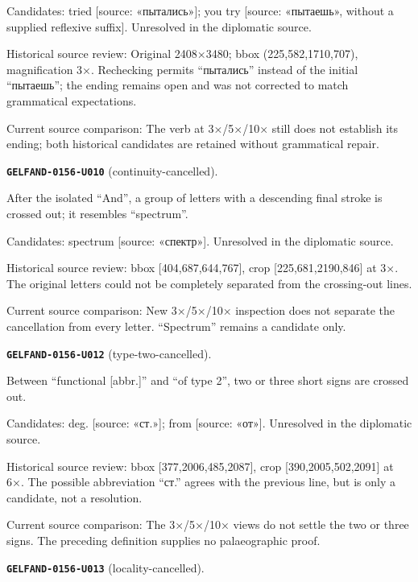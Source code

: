 Candidates: tried [source: «пытались»]; you try [source: «пытаешь», without a supplied reflexive suffix]. Unresolved in the diplomatic source.\par
Historical source review: Original 2408×3480; bbox (225,582,1710,707), magnification 3×. Rechecking permits “пытались” instead of the initial “пытаешь”; the ending remains open and was not corrected to match grammatical expectations.\par
Current source comparison: The verb at 3×/5×/10× still does not establish its ending; both historical candidates are retained without grammatical repair.\par\medskip
\par\noindent\leavevmode{}\label{GELFAND-0156-U010}\label{GELFAND-P001439:continuity-cancelled}\textbf{\texttt{GELFAND-0156-U010}} (continuity-cancelled).\nopagebreak[4]\par
After the isolated “And”, a group of letters with a descending final stroke is crossed out; it resembles “spectrum”.\par
Candidates: spectrum [source: «спектр»]. Unresolved in the diplomatic source.\par
Historical source review: bbox [404,687,644,767], crop [225,681,2190,846] at 3×. The original letters could not be completely separated from the crossing-out lines.\par
Current source comparison: New 3×/5×/10× inspection does not separate the cancellation from every letter. “Spectrum” remains a candidate only.\par\medskip
\par\noindent\leavevmode{}\label{GELFAND-0156-U012}\label{GELFAND-P001439:type-two-cancelled}\textbf{\texttt{GELFAND-0156-U012}} (type-two-cancelled).\nopagebreak[4]\par
Between “functional [abbr.]” and “of type 2”, two or three short signs are crossed out.\par
Candidates: deg. [source: «ст.»]; from [source: «от»]. Unresolved in the diplomatic source.\par
Historical source review: bbox [377,2006,485,2087], crop [390,2005,502,2091] at 6×. The possible abbreviation “ст.” agrees with the previous line, but is only a candidate, not a resolution.\par
Current source comparison: The 3×/5×/10× views do not settle the two or three signs. The preceding definition supplies no palaeographic proof.\par\medskip
\par\noindent\leavevmode{}\label{GELFAND-0156-U013}\label{GELFAND-P001439:locality-cancelled}\textbf{\texttt{GELFAND-0156-U013}} (locality-cancelled).\nopagebreak[4]\par
